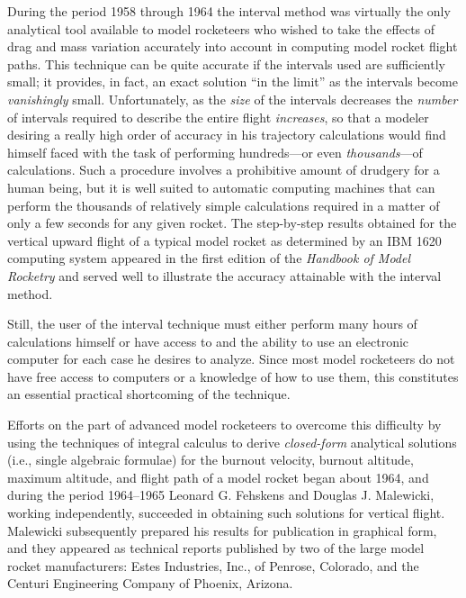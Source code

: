During the period 1958 through 1964 the interval method was virtually the only analytical tool
available to model rocketeers who wished to take the effects of drag and mass variation accurately
into account in computing model rocket flight paths. This technique can be quite accurate if the
intervals used are sufficiently small; it provides, in fact, an exact solution ``in the limit'' as
the intervals become \emph{vanishingly} small. Unfortunately, as the \emph{size} of the intervals
decreases the \emph{number} of intervals required to describe the entire flight
\emph{increases}, so that a modeler desiring a really high order of accuracy in his trajectory
calculations would find himself faced with the task of performing hundreds---or even
\emph{thousands}---of calculations. Such a procedure involves a prohibitive amount of drudgery for
a human being, but it is well suited to automatic computing machines that can perform the thousands
of relatively simple calculations required in a matter of only a few seconds for any given rocket.
The step-by-step results obtained for the vertical upward flight of a typical model rocket as
determined by an IBM 1620 computing system appeared in the first edition of the \emph{Handbook of
Model Rocketry} and served well to illustrate the accuracy attainable with the interval method.

Still, the user of the interval technique must either perform many hours of calculations himself
or have access to and the ability to use an electronic computer for each case he desires to
analyze. Since most model rocketeers do not have free access to computers or a knowledge of how to
use them, this constitutes an essential practical shortcoming of the technique.

Efforts on the part of advanced model rocketeers to overcome this difficulty by using the
techniques of integral calculus to derive \emph{closed-form} analytical solutions (i.e., single
algebraic formulae) for the burnout velocity, burnout altitude, maximum altitude, and flight path of
a model rocket began about 1964, and during the period 1964--1965 Leonard G. Fehskens and Douglas
J. Malewicki, working independently, succeeded in obtaining such solutions for vertical flight.
Malewicki subsequently prepared his results for publication in graphical form, and they appeared
as technical reports published by two of the large model rocket manufacturers: Estes Industries,
Inc., of Penrose, Colorado, and the Centuri Engineering Company of Phoenix, Arizona.

